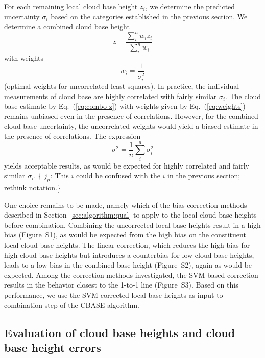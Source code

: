 \documentclass[amt,manuscript]{copernicus}\usepackage[]{graphicx}\usepackage[]{color}
\newcommand{\hlnum}[1]{\textcolor[rgb]{0.686,0.059,0.569}{#1}}%
\newcommand\comment[2]{\{\hlnum{ \textit{#1}: #2}\}}
\newcommand\commentjm[1]{\comment{$j_\mu$}{#1}}
\begin{document}
For each remaining local cloud base height $z_i$, we determine the predicted
uncertainty $\sigma_i$ based on the categories established in the previous
section.  We determine a combined cloud base height
\begin{equation}
  \label{eq:combo-z}
  z = \frac{\sum\limits_i^n w_i z_i}{\sum\limits_i^n w_i}
\end{equation}
with weights
\begin{equation}
  \label{eq:weights}
  w_i = \frac 1 {\sigma_i^2}
\end{equation}
(optimal weights for uncorrelated least-squares).  In practice, the individual
measurements of cloud base are highly correlated with fairly similar
$\sigma_i$.  The cloud base estimate by Eq.~(\ref{eq:combo-z}) with weights
given by Eq.~(\ref{eq:weights}) remains unbiased even in the presence of
correlations.  However, for the combined cloud base uncertainty,
the uncorrelated weights would yield a biased estimate in the presence of
correlations.  The expression
\begin{equation}
  \label{eq:combo-sigma}
  \sigma^2 = \frac 1 n \sum\limits_i^n \sigma_i^2
\end{equation}
yields acceptable results, as would be expected for highly correlated and fairly
similar $\sigma_i$.  \commentjm{This $i$ could be confused with the $i$ in the
  previous section; rethink notation.}

One choice remains to be made, namely which of the bias correction methods
described in Section~\ref{sec:algorithm:qual} to apply to the local cloud base
heights before combination.  Combining the uncorrected local base heights result
in a high bias (Figure~S1), as would be expected from the high bias on the
constituent local cloud base heights.  The linear correction, which reduces the
high bias for high cloud base heights but introduces a counterbias for low cloud
base heights, leads to a low bias in the combined base height (Figure~S2), again
as would be expected.  Among the correction methods investigated, the SVM-based
correction results in the behavior closest to the 1-to-1 line (Figure~S3).
Based on this performance, we use the SVM-corrected local base heights as input
to combination step of the CBASE algorithm.

\subsection{Evaluation of cloud base heights and cloud base height errors}
\label{sec:algorithm:eval}
\end{document}
